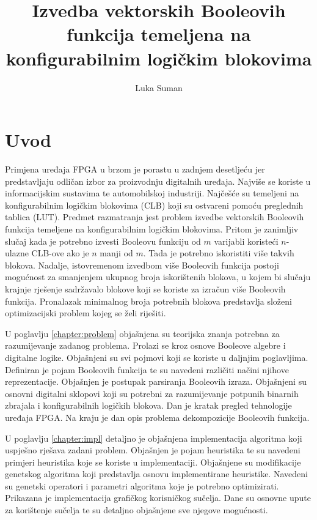 \documentclass[times, utf8, diplomski]{fer}
\begin{document}

\title{Izvedba vektorskih Booleovih funkcija temeljena na konfigurabilnim logičkim blokovima}

\author{Luka Suman}

\maketitle



\zahvala{}

\tableofcontents

\chapter{Uvod} \label{chapter:introduction}

Primjena uređaja FPGA u brzom je porastu u zadnjem desetljeću jer predstavljaju odličan izbor za proizvodnju digitalnih uređaja. Najviše se koriste u informacijskim sustavima te automobilskoj industriji. Najčešće su temeljeni na konfigurabilnim logičkim blokovima (CLB) koji su ostvareni pomoću preglednih tablica (LUT). Predmet razmatranja jest problem izvedbe vektorskih Booleovih funkcija temeljene na konfigurabilnim logičkim blokovima. Pritom je zanimljiv slučaj kada je potrebno izvesti Booleovu funkciju od $m$ varijabli koristeći $n$-ulazne CLB-ove ako je $n$ manji od $m$. Tada je potrebno iskoristiti više takvih blokova. Nadalje, istovremenom izvedbom više Booleovih funkcija postoji mogućnost za smanjenjem ukupnog broja iskorištenih blokova, u kojem bi slučaju krajnje rješenje sadržavalo blokove koji se koriste za izračun više Booleovih funkcija. Pronalazak minimalnog broja potrebnih blokova predstavlja složeni optimizacijski problem kojeg se želi riješiti.

U poglavlju \ref{chapter:problem} objašnjena su teorijska znanja potrebna za razumijevanje zadanog problema. Prolazi se kroz osnove Booleove algebre i digitalne logike. Objašnjeni su svi pojmovi koji se koriste u daljnjim poglavljima. Definiran je pojam Booleovih funkcija te su navedeni različiti načini njihove reprezentacije. Objašnjen je postupak parsiranja Booleovih izraza. Objašnjeni su osnovni digitalni sklopovi koji su potrebni za razumijevanje potpunih binarnih zbrajala i konfigurabilnih logičkih blokova. Dan je kratak pregled tehnologije uređaja FPGA. Na kraju je dan opis problema dekompozicije Booleovih funkcija.

U poglavlju \ref{chapter:impl} detaljno je objašnjena implementacija algoritma koji uspješno rješava zadani problem. Objašnjen je pojam heuristika te su navedeni primjeri heuristika koje se koriste u implementaciji. Objašnjene su modifikacije genetskog algoritma koji predstavlja osnovu implementirane heuristike. Navedeni su genetski operatori i parametri algoritma koje je potrebno optimizirati. Prikazana je implementacija grafičkog korisničkog sučelja. Dane su osnovne upute za korištenje sučelja te su detaljno objašnjene sve njegove mogućnosti.
\end{document}
